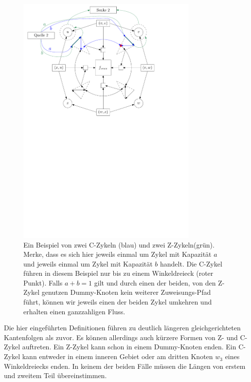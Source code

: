 \begin{figure}[b!]
\centering
\includegraphics[width=0.8\textwidth]{combined_face_alt_cycle.pdf}
\caption{Ein Beispiel von zwei C-Zykeln (blau) und zwei Z-Zykeln(grün). Merke, dass es sich hier jeweils einmal um Zykel mit Kapazität $a$ und jeweils einmal um Zykel mit Kapazität $b$ handelt. Die C-Zykel führen in diesem Beispiel nur bis zu einem Winkeldreieck (roter Punkt). Falls $a+b=1$ gilt und durch einen der beiden, von den Z-Zykel genutzen Dummy-Knoten kein weiterer Zuweisungs-Pfad führt, können wir jeweils einen der beiden Zykel umkehren und erhalten einen ganzzahligen Fluss.}
\label{combined_face_alt_cycle}
\end{figure}

\begin{remark}
Die hier eingeführten Definitionen führen zu deutlich längeren gleichgerichteten Kantenfolgen als zuvor. Es können allerdings auch kürzere Formen von Z- und C-Zykel auftreten. Ein Z-Zykel kann schon in einem Dummy-Knoten enden. Ein C-Zykel kann entweder in einem inneren Gebiet oder am dritten Knoten $w_3$ eines Winkel\-dreiecks enden. In keinem der beiden Fälle müssen die Längen von erstem und zweitem Teil übereinstimmen.
\end{remark}

